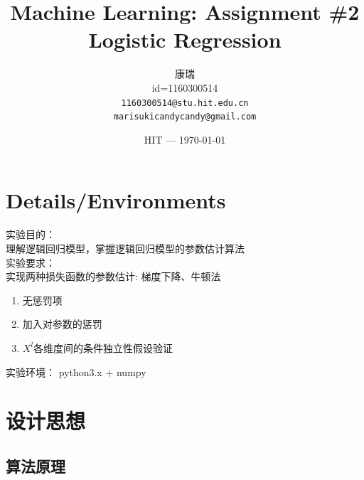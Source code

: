 \documentclass{article}
\title{Machine Learning: Assignment \#2 \\ Logistic Regression} %
\author{康瑞\\id=1160300514\\ \texttt{1160300514@stu.hit.edu.cn} \\ \texttt{marisukicandycandy@gmail.com}} %
\date{HIT --- \today} %
\begin{document}
\maketitle 

\tableofcontents
\newpage

\section{Details/Environments} %

实验目的： \\理解逻辑回归模型，掌握逻辑回归模型的参数估计算法\\

实验要求：\\实现两种损失函数的参数估计: 梯度下降、牛顿法\\
\linespread{0.5}
\begin{enumerate}
\item 无惩罚项
\item 加入对参数的惩罚
\item $X^l$各维度间的条件独立性假设验证
\end{enumerate}

实验环境： python3.x + numpy

\section{设计思想}

\subsection{算法原理}
\end{document}
